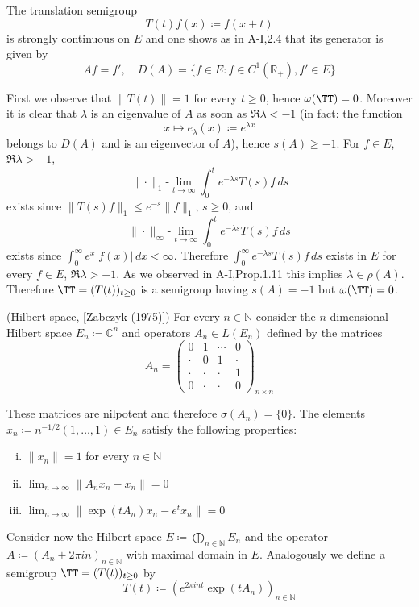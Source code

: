The translation semigroup
\[
    T(t)f(x) \coloneqq f(x+t)
\]
is strongly continuous on $E$ and one shows as in A-I,2.4 that its generator is given by
\[
    Af = f', \quad D(A) = \{ f \in E : f \in C^{1}(\mathbb{R}_{+}), f' \in E \}
\]

First we observe that $\|T(t)\| = 1$ for every $t \geq 0$, hence $\omega(\TT) = 0$.
Moreover it is clear that $\lambda$ is an eigenvalue of $A$ as soon as $\Re\lambda < -1$ (in fact: the function
\[
    x \mapsto e_{\lambda}(x) \coloneqq e^{\lambda x}
\]
belongs to $D(A)$ and is an eigenvector of $A$), hence $s(A) \geq -1$.
For $f \in E$, $\Re\lambda > -1$,
\[
    \|\cdot\|_{1}\text{-}\lim_{t \to \infty} \int_{0}^{t} e^{-\lambda s}T(s)f \, ds
\]
exists since $\|T(s)f\|_{1} \leq e^{-s}\|f\|_{1}$, $s \geq 0$, and
\[
    \|\cdot\|_{\infty}\text{-}\lim_{t \to \infty} \int_{0}^{t} e^{-\lambda s}T(s)f \, ds
\]
exists since $\int_{0}^{\infty} e^{x}|f(x)| \, dx < \infty$.
Therefore $\int_{0}^{\infty} e^{-\lambda s}T(s)f \, ds$ exists in $E$ for every $f \in E$, $\Re\lambda > -1$.
As we observed in A-I,Prop.1.11 this implies $\lambda \in \rho(A)$.
Therefore $\TT = (T(t))_{t\geq 0}$ is a semigroup having $s(A) = -1$ but $\omega(\TT) = 0$.
\begin{example}\label{ex:a3-1.4}
(Hilbert space, [Zabczyk (1975)])
For every $n \in \mathbb{N}$ consider the $n$-dimensional Hilbert space $E_{n} \coloneqq \mathbb{C}^{n}$ and operators $A_{n} \in L(E_{n})$ defined by the matrices
\[
    A_{n} = \begin{pmatrix}
    0 & 1 & \cdots & 0 \\
    \cdot & 0 & 1 & \cdot \\
    \cdot & \cdot & \cdot & 1 \\
    0 & \cdot & \cdot & 0
    \end{pmatrix}_{n \times n}
\]

These matrices are nilpotent and therefore $\sigma(A_{n}) = \{0\}$.
The elements $x_{n} \coloneqq n^{-1/2}(1, \ldots, 1) \in E_{n}$ satisfy the following properties:

\begin{enumerate}[(i)]
\item 
$\|x_{n}\| = 1$ for every $n \in \mathbb{N}$

\item 
$\lim_{n \to \infty} \|A_{n}x_{n} - x_{n}\| = 0$

\item 
$\lim_{n \to \infty} \|\exp(tA_{n})x_{n} - e^{t}x_{n}\| = 0$

\end{enumerate}
Consider now the Hilbert space $E \coloneqq \bigoplus_{n \in \mathbb{N}} E_{n}$ and the operator $A \coloneqq (A_{n} + 2\pi in)_{n \in \mathbb{N}}$ with maximal domain in $E$.
Analogously we define a semigroup $\TT = (T(t))_{t \geq 0}$ by
\[
    T(t) \coloneqq (e^{2\pi int}\exp(tA_{n}))_{n \in \mathbb{N}}
\]
\end{example}

